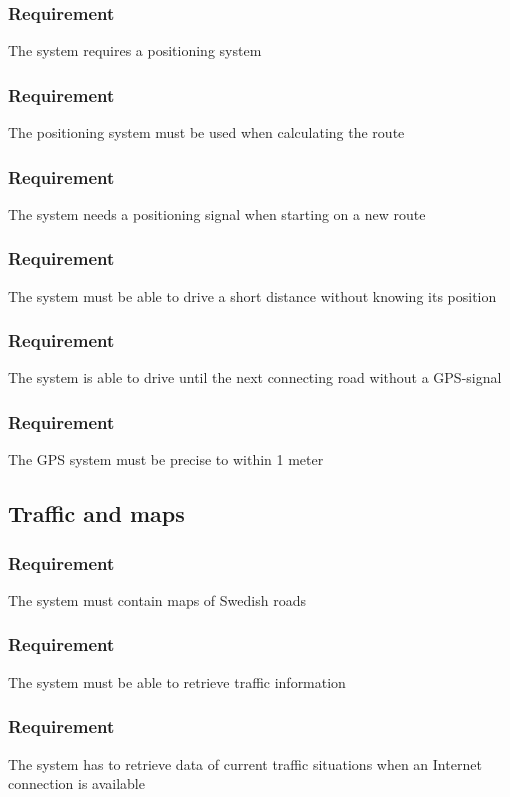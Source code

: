 \documentclass{article}
\begin{document}
{      \subsubsection{Requirement}
\hfill \break 
\- \- \-The system requires a positioning system
      \subsubsection{Requirement}
\hfill \break 
\- \- \-The positioning system must be used when calculating the route
      \subsubsection{Requirement}
\hfill \break 
\- \- \-The system needs a positioning signal when starting on a new route
      \subsubsection{Requirement}
\hfill \break 
\- \- \-The system must be able to drive a short distance without knowing its position
      \subsubsection{Requirement}
\hfill \break 
\- \- \-The system is able to drive until the next connecting road without a GPS-signal
      \subsubsection{Requirement}
\hfill \break 
\- \- \-The GPS system must be precise to within 1 meter
  \subsection{Traffic and maps}
      \subsubsection{Requirement}
\hfill \break 
\- \- \-The system must contain maps of Swedish roads
      \subsubsection{Requirement}
\hfill \break 
\- \- \-The system must be able to retrieve traffic information
      \subsubsection{Requirement}
\hfill \break 
\- \- \-The system has to retrieve data of current traffic situations when an Internet connection is available
}
\end{document}
